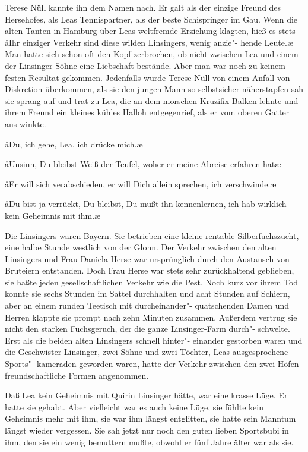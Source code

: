 Terese Nüll kannte ihn dem Namen nach. Er galt als der einzige
Freund des Hersehofes, als Leas Tennispartner, als der beste
Schispringer im Gau. Wenn die alten Tanten in Hamburg
über Leas weltfremde Erziehung klagten, hieß es stets\dopp{} \aa{}Ihr
einziger Verkehr sind diese wilden Linsingers, wenig anzie"-%
hende Leute.\ae{} Man hatte sich schon oft den Kopf zerbrochen,
ob nicht zwischen Lea und einem der Linsinger-Söhne eine
Liebschaft bestände. Aber man war noch zu keinem festen
Resultat gekommen. Jedenfalls wurde Terese Nüll von einem
Anfall von Diskretion überkommen, als sie den jungen Mann
so selbstsicher näherstapfen sah\dopp{} sie sprang auf und trat zu Lea,
die an dem morschen Kruzifix-Balken lehnte und ihrem
Freund ein kleines kühles Halloh entgegenrief, als er vom
oberen Gatter aus winkte.

\aa{}Du, ich gehe, Lea, ich drücke mich.\ae{}

\aa{}Unsinn, Du bleibst\ausr{} Weiß der Teufel, woher er meine Abreise
erfahren hat\ausr{}\ae{}

\aa{}Er will sich verabschieden, er will Dich allein sprechen, ich
verschwinde.\ae{}

\aa{}Du bist ja verrückt, Du bleibst, Du mußt ihn kennenlernen,
ich hab wirklich kein Geheimnis mit ihm.\ae{}

Die Linsingers waren Bayern. Sie betrieben eine kleine
rentable Silberfuchszucht, eine halbe Stunde westlich von
der Glonn. Der Verkehr zwischen den alten Linsingers und
Frau Daniela Herse war ursprünglich durch den Austausch
von Bruteiern entstanden. Doch Frau Herse war stets sehr
zurückhaltend geblieben, sie haßte jeden gesellschaftlichen
Verkehr wie die Pest. Noch kurz vor ihrem Tod konnte sie
sechs Stunden im Sattel durchhalten und acht Stunden auf
Schiern, aber an einem runden Teetisch mit durcheinander"-%
quatschenden Damen und Herren klappte sie prompt nach
zehn Minuten zusammen. Außerdem vertrug sie nicht den
starken Fuchsgeruch, der die ganze Linsinger-Farm durch"-%
schwelte. Erst als die beiden alten Linsingers schnell hinter"-%
einander gestorben waren und die Geschwister Linsinger,
zwei Söhne und zwei Töchter, Leas ausgesprochene Sports"-%
kameraden geworden waren, hatte der Verkehr zwischen den
zwei Höfen freundschaftliche Formen angenommen.

Daß Lea kein Geheimnis mit Quirin Linsinger hätte, war eine
krasse Lüge. Er hatte sie gehabt. Aber vielleicht war es auch
keine Lüge, sie fühlte kein Geheimnis mehr mit ihm, sie war
ihm längst entglitten, sie hatte sein Manntum längst wieder
vergessen. Sie sah jetzt nur noch den guten lieben Sportsbubi
in ihm, den sie ein wenig bemuttern mußte, obwohl er fünf
Jahre älter war als sie.

